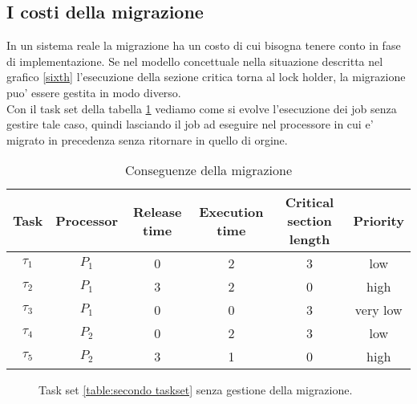 \documentclass[a4paper,11pt]{article}
\begin{document}
\subsection{I costi della migrazione}

\noindent In un sistema reale la migrazione ha un costo di cui bisogna tenere conto in fase di implementazione. Se nel modello concettuale nella situazione descritta nel grafico \ref{sixth} l'esecuzione della sezione critica torna al lock holder, la migrazione puo' essere gestita in modo diverso.\\

\noindent Con il task set della tabella \ref{table:terzo taskset} vediamo come si evolve l'esecuzione dei job senza gestire tale caso, quindi lasciando il job ad eseguire nel processore in cui e' migrato in precedenza senza ritornare in quello di orgine.\\

\begin{table}
	\centering
	\begin{tabular}{cccccc}
	\hline\hline
    Task     & Processor & Release time & Execution time & Critical section length & Priority \\ \hline
    $\tau_1$ & $P_1$  & 0            & 2              & 3                       & low      \\
    $\tau_2$ & $P_1$  & 3            & 2              & 0                       & high     \\
    $\tau_3$ & $P_1$  & 0            & 0              & 3                       & very low     \\
    $\tau_4$ & $P_2$  & 0            & 2              & 3                       & low      \\
    $\tau_5$ & $P_2$  & 3            & 1              & 0                       & high     \\
    \hline
    \end{tabular}
	\caption{Conseguenze della migrazione}
	\label{table:terzo taskset} 
\end{table}

\begin{figure}
	\ModelloConcettualeSeventh
	\caption{Task set \ref{table:secondo taskset} senza gestione della migrazione.}
	\label{seventh}
\end{figure}
\end{document}
